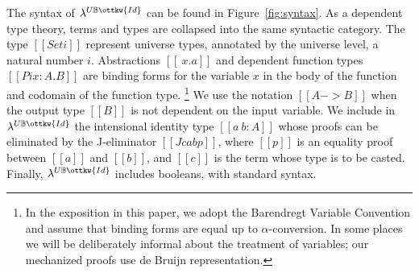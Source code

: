 \documentclass[acmsmall,screen=true,
\ifpublic review=false\else,review=true\fi
  ,anonymous=\ifanonymous true\else false\fi]{acmart}
\newcommand{\lang}{$\lambda^{U\mathbb{B}\ottkw{Id}}$\xspace}
\newcommand{\scw}[1]{}
\begin{document}
The syntax of \lang can be found in Figure~\ref{fig:syntax}.  As a dependent
type theory, terms and types are collapsed into the same syntactic
category. The type $[[Set i]]$ represent universe types, annotated by 
the universe level, a natural number $i$.%
Abstractions $[[ \ x . a ]]$ and dependent function types $[[Pi x : A . B]]$
are binding forms for the variable $x$ in the body of the function and
codomain of the function type.  \footnote{In the exposition in this paper, we
  adopt the Barendregt Variable Convention and assume that binding forms are
  equal up to $\alpha$-conversion.  In some places we will be deliberately
  informal about the treatment of variables; our mechanized proofs use de
  Bruijn representation.}  We use the notation $[[A -> B]]$ when the output
type $[[B]]$ is not dependent on the input variable.  We include in \lang{}
the intensional identity type $[[a ~ b : A]]$ whose proofs can be eliminated
by the J-eliminator $[[J c a b p]]$, where $[[p]]$ is an equality proof
between $[[a]]$ and $[[b]]$, and $[[c]]$ is the term whose type is to be
casted.  Finally, \lang{} includes booleans, with standard syntax.
\scw{Example of what you can use identity types for? Or an example of a
  program that uses J?}

\end{document}
